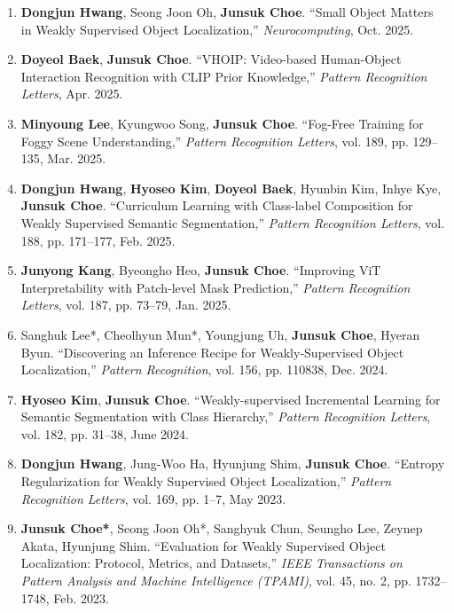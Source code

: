\documentclass[letterpaper,11pt]{article}
\begin{document}
\begin{enumerate}[itemsep=5.5pt]

    \item \textbf{Dongjun Hwang}, Seong Joon Oh, \textbf{Junsuk Choe}.
    ``Small Object Matters in Weakly Supervised Object Localization,''
    \textit{Neurocomputing},
    Oct. 2025.

    \item \textbf{Doyeol Baek}, \textbf{Junsuk Choe}.
    ``VHOIP: Video-based Human-Object Interaction Recognition with CLIP Prior Knowledge,''
    \textit{Pattern Recognition Letters},
    Apr. 2025.

    \item \textbf{Minyoung Lee}, Kyungwoo Song, \textbf{Junsuk Choe}.
    ``Fog-Free Training for Foggy Scene Understanding,''
    \textit{Pattern Recognition Letters},
    vol. 189, pp. 129--135, Mar. 2025.

    \item \textbf{Dongjun Hwang}, \textbf{Hyoseo Kim}, \textbf{Doyeol Baek}, Hyunbin Kim, Inhye Kye, \textbf{Junsuk Choe}.
    ``Curriculum Learning with Class-label Composition for Weakly Supervised Semantic Segmentation,''
    \textit{Pattern Recognition Letters},
    vol. 188, pp. 171--177, Feb. 2025.

    \item \textbf{Junyong Kang}, Byeongho Heo, \textbf{Junsuk Choe}.
    ``Improving ViT Interpretability with Patch-level Mask Prediction,''
    \textit{Pattern Recognition Letters},
    vol. 187, pp. 73--79, Jan. 2025.

    \item Sanghuk Lee*, Cheolhyun Mun*, Youngjung Uh, \textbf{Junsuk Choe}, Hyeran Byun.
    ``Discovering an Inference Recipe for Weakly-Supervised Object Localization,''
    \textit{Pattern Recognition},
    vol. 156, pp. 110838, Dec. 2024.

    \item \textbf{Hyoseo Kim}, \textbf{Junsuk Choe}.
    ``Weakly-supervised Incremental Learning for Semantic Segmentation with Class Hierarchy,''
    \textit{Pattern Recognition Letters},
    vol. 182, pp. 31--38, June 2024.

    \item \textbf{Dongjun Hwang}, Jung-Woo Ha, Hyunjung Shim, \textbf{Junsuk Choe}.
    ``Entropy Regularization for Weakly Supervised Object Localization,''
    \textit{Pattern Recognition Letters},
    vol. 169, pp. 1--7, May 2023.

    \item \textbf{Junsuk Choe*}, Seong Joon Oh*, Sanghyuk Chun, Seungho Lee, Zeynep Akata, Hyunjung Shim.
    ``Evaluation for Weakly Supervised Object Localization: Protocol, Metrics, and Datasets,''
    \textit{IEEE Transactions on Pattern Analysis and Machine Intelligence (TPAMI)},
    vol. 45, no. 2, pp. 1732--1748, Feb. 2023.


\end{enumerate}
\end{document}
